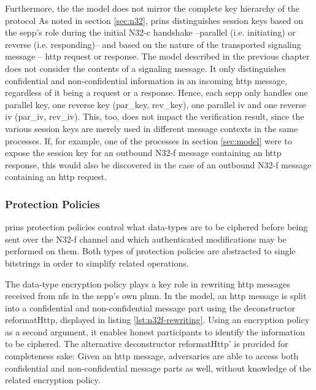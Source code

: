 Furthermore, the the model does not mirror the complete key hierarchy of the protocol
As noted in section \ref{sec:n32}, \gls{prins} distinguishes session keys based on the \gls{sepp}'s role during the initial N32-c handshake --parallel (i.e. initiating) or reverse (i.e. responding)-- and based on the nature of the transported signaling message -- \gls{http} request or response.
The model described in the previous chapter does not consider the contents of a signaling message.
It only distinguishes confidential and non-confidential information in an incoming \gls{http} message, regardless of it being a request or a response.
Hence, each \gls{sepp} only handles one parallel key, one reverse key ({\sffamily par\_key}, {\sffamily rev\_key}), one parallel \gls{iv} and one reverse \gls{iv} ({\sffamily par\_iv}, {\sffamily rev\_iv}).
This, too, does not impact the verification result, since the various session keys are merely used in different message contexts in the same processes.
If, for example, one of the processes in section \ref{sec:model} were to expose the session key for an outbound N32-f message containing an \gls{http} response, this would also be discovered in the case of an outbound N32-f message containing an \gls{http} request.

\subsubsection{Protection Policies}

\gls{prins} protection policies control what data-types are to be ciphered before being sent over the N32-f channel and which authenticated modifications may be performed on them.
Both types of protection policies are abstracted to single bitstrings in order to simplify related operations.

The data-type encryption policy plays a key role in rewriting \gls{http} messages received from \glspl{nf} in the \gls{sepp}'s own \gls{plmn}.
In the model, an \gls{http} message is split into a confidential and non-confidential message part using the deconstructor {\sffamily reformatHttp}, displayed in listing \ref{lst:n32f-rewriting}.
Using an encryption policy as a second argument, it enables honest participants to identify the information to be ciphered.
The alternative deconstructor {\sffamily reformatHttp'} is provided for completeness sake:
Given an \gls{http} message, adversaries are able to access both confidential and non-confidential message parts as well, without knowledge of the related encryption policy.

